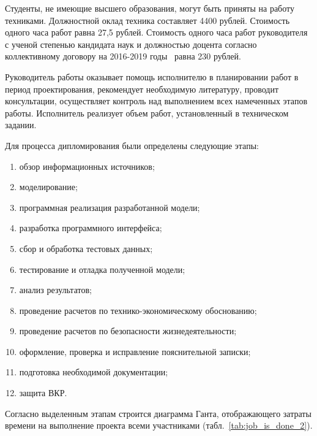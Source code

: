 Студенты, не имеющие высшего образования, могут быть приняты на
работу техниками. Должностной оклад техника составляет 4400 рублей.
Стоимость одного часа работ равна 27,5 рублей.
Стоимость одного часа работ руководителя с ученой степенью кандидата наук и должностью доцента
согласно коллективному договору на 2016-2019 годы~\cite{kollectiv}
равна 230 рублей.   

Руководитель работы оказывает помощь исполнителю в планировании работ в период проектирования, рекомендует
необходимую литературу, проводит консультации, осуществляет контроль над выполнением всех 
намеченных этапов работы. Исполнитель реализует объем работ, установленный в техническом задании.

Для процесса дипломирования были определены следующие этапы:
\begin{enumerate}
 \item обзор информационных источников;
 \item моделирование;
 \item программная реализация разработанной модели;
 \item разработка программного интерфейса;
 \item сбор и обработка тестовых данных;
 \item тестирование и отладка полученной модели;
 \item анализ результатов;
 \item проведение расчетов по технико-экономическому обоснованию;
 \item проведение расчетов по безопасности жизнедеятельности;
 \item оформление, проверка и исправление пояснительной записки;
 \item подготовка необходимой документации;
 \item защита ВКР.
\end{enumerate}


Согласно выделенным этапам строится диаграмма
Ганта, отображающего затраты времени на выполнение проекта всеми
участниками (табл.~\ref{tab:job_is_done_2}).


